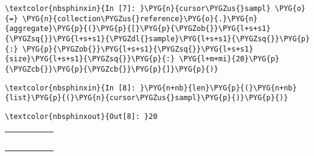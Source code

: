 \documentclass[letterpaper,10pt,english]{sphinxmanual}
\begin{document}
%
\begin{Verbatim}[commandchars=\\\{\}]
\textcolor{nbsphinxin}{In [7]: }\PYG{n}{cursor\PYGZus{}sampl} \PYG{o}{=} \PYG{n}{collection\PYGZus{}reference}\PYG{o}{.}\PYG{n}{aggregate}\PYG{p}{(}\PYG{p}{[}\PYG{p}{\PYGZob{}}\PYG{l+s+s1}{\PYGZsq{}}\PYG{l+s+s1}{\PYGZdl{}sample}\PYG{l+s+s1}{\PYGZsq{}}\PYG{p}{:} \PYG{p}{\PYGZob{}}\PYG{l+s+s1}{\PYGZsq{}}\PYG{l+s+s1}{size}\PYG{l+s+s1}{\PYGZsq{}}\PYG{p}{:} \PYG{l+m+mi}{20}\PYG{p}{\PYGZcb{}}\PYG{p}{\PYGZcb{}}\PYG{p}{]}\PYG{p}{)}
\end{Verbatim}

%
\begin{Verbatim}[commandchars=\\\{\}]
\textcolor{nbsphinxin}{In [8]: }\PYG{n+nb}{len}\PYG{p}{(}\PYG{n+nb}{list}\PYG{p}{(}\PYG{n}{cursor\PYGZus{}sampl}\PYG{p}{)}\PYG{p}{)}
\end{Verbatim}

%
\begin{Verbatim}[commandchars=\\\{\}]
\textcolor{nbsphinxout}{Out[8]: }20
\end{Verbatim}


\begin{savenotes}\sphinxattablestart
\centering
\begin{tabulary}{\linewidth}[t]{|T|T|T|T|T|}
\hline

&
&
&
&
\\
\hline
{}
&
&
&
&
\\
\hline
{}
&
&
&
&
\\
\hline
{}
&
&
&
&
\\
\hline
{}
&
&
&
&
\\
\hline
{}
&
&
&
&\\
\hline
\end{tabulary}
\par
\sphinxattableend\end{savenotes}
\end{document}
